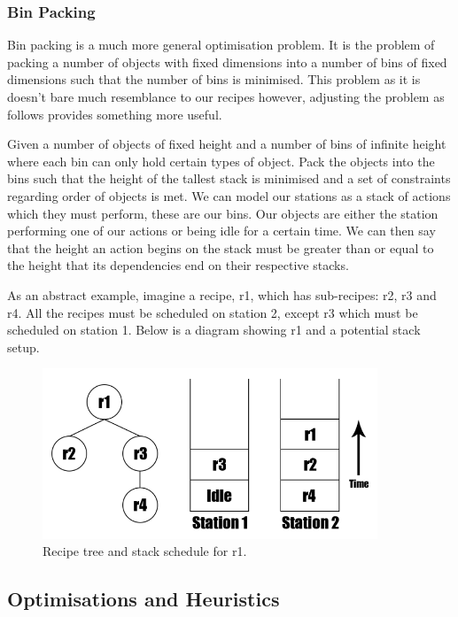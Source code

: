 \documentclass[11pt]{article}
\begin{document}
\subsubsection{Bin Packing}

Bin packing is a much more general optimisation problem. It is the problem of packing a number
of objects with fixed dimensions into a number of bins of fixed dimensions such that the number
of bins is minimised. This problem as it is doesn't bare much resemblance to our recipes however,
adjusting the problem as follows provides something more useful.

\medbreak

Given a number of objects of fixed height and a number of bins of infinite height where each
bin can only hold certain types of object. Pack the objects into the bins such that the
height of the tallest stack is minimised and a set of constraints regarding order of
objects is met. We can model our stations as a stack of actions which they must perform,
these are our bins. Our objects are either the station performing one of our actions
or being idle for a certain time. We can then say that the height an action begins on
the stack must be greater than or equal to the height that its dependencies end on their
respective stacks.

\medbreak

As an abstract example, imagine a recipe, r1, which has sub-recipes: r2, r3 and r4. All the
recipes must be scheduled on station 2, except r3 which must be scheduled on station 1.
Below is a diagram showing r1 and a potential stack setup.

\begin{figure}[h]
\includegraphics[width=10cm, keepaspectratio]{stacks.png}
\centering
\caption{Recipe tree and stack schedule for r1.}
\end{figure}

\subsection{Optimisations and Heuristics}
\end{document}

